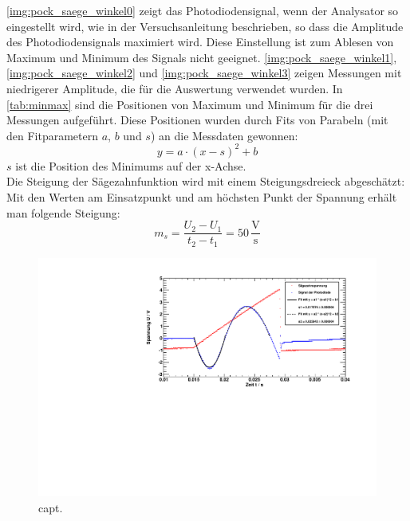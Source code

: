 \autoref{img:pock_saege_winkel0} zeigt das Photodiodensignal, wenn der Analysator so eingestellt wird,
wie in der Versuchsanleitung beschrieben, so dass die Amplitude des Photodiodensignals maximiert wird.
Diese Einstellung ist zum Ablesen von Maximum und Minimum des Signals nicht geeignet.
\autoref{img:pock_saege_winkel1}, \autoref{img:pock_saege_winkel2} und \autoref{img:pock_saege_winkel3}
zeigen Messungen mit niedrigerer Amplitude, die für die Auswertung verwendet wurden.
In \autoref{tab:minmax} sind die Positionen von Maximum und Minimum für die drei Messungen aufgeführt.
Diese Positionen wurden durch Fits von Parabeln (mit den Fitparametern $a$, $b$ und $s$) an die Messdaten gewonnen:
\begin{equation}
  y = a \cdot (x-s)^2+b
\end{equation}
$s$ ist die Position des Minimums auf der x-Achse.\\
Die Steigung der Sägezahnfunktion wird mit einem Steigungsdreieck abgeschätzt:
Mit den Werten am Einsatzpunkt und am höchsten Punkt der Spannung erhält man folgende Steigung:
\begin{equation}
  m_s = \frac{U_2-U_1}{t_2-t_1} = 50 \,\frac{\text{V}}{\text{s}}
\end{equation}

\begin{figure}[H]
\begin{center}
  \includegraphics[width=15cm]{../img/pock_saege_winkel1.pdf}
  \caption{capt.}
  \label{img:pock_saege_winkel1}
\end{center}
\end{figure}

